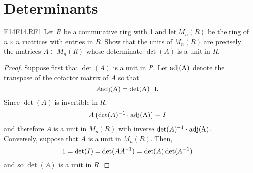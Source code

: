 \documentclass[../AlgebraQualSolutions.tex]{subfiles}
\begin{document}
\section{Determinants}

\begin{prob}{F14}{F14.RF1}
	Let $R$ be a commutative ring with 1 and let $M_n(R)$ be the ring of $n \times n$ matrices with entries in $R$. Show that the units of $M_n(R)$ are precisely the matrices $A \in M_n(R)$ whose determinate $\det(A)$ is a unit in $R$.
\end{prob}

\begin{proof}
	Suppose first that $\det(A)$ is a unit in $R$. Let $\rm{adj}(A)$ denote the transpose of the cofactor matrix of $A$ so that
		\[A \rm{adj}(A) = \det(A) \cdot I. \]
	Since $\det(A)$ is invertible in $R$,
		\[A\left(\det(A)^{-1} \cdot \rm{adj}(A)\right) = I\]
	and therefore $A$ is a unit in $M_n(R)$ with inverse $\det(A)^{-1} \cdot \rm{adj}(A)$.\\

	Conversely, suppose that $A$ is a unit in $M_n(R)$. Then,
		\[1 = \det(I) = \det(AA^{-1}) = \det(A)\det(A^{-1})\]
	and so $\det(A)$ is a unit in $R$.
\end{proof}
\end{document}
